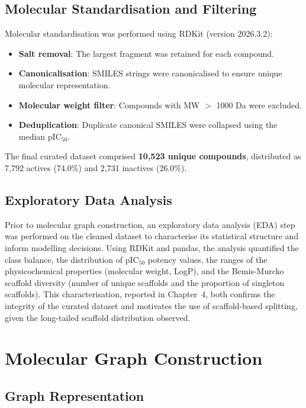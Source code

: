 \subsection{Molecular Standardisation and Filtering}

Molecular standardisation was performed using RDKit (version 2026.3.2):
\begin{itemize}
    \item \textbf{Salt removal}: The largest fragment was retained for each compound.
    \item \textbf{Canonicalisation}: SMILES strings were canonicalised to ensure
          unique molecular representation.
    \item \textbf{Molecular weight filter}: Compounds with MW $>$ 1000 Da
          were excluded.
    \item \textbf{Deduplication}: Duplicate canonical SMILES were collapsed using
          the median pIC$_{50}$.
\end{itemize}

The final curated dataset comprised \textbf{10,523 unique compounds}, distributed
as 7,792 actives (74.0\%) and 2,731 inactives (26.0\%).

\subsection{Exploratory Data Analysis}

Prior to molecular graph construction, an exploratory data analysis (EDA) step was
performed on the cleaned dataset to characterise its statistical structure and inform
modelling decisions. Using RDKit and pandas, the analysis quantified the class
balance, the distribution of pIC$_{50}$ potency values, the ranges of the
physicochemical properties (molecular weight, LogP), and the Bemis-Murcko scaffold
diversity (number of unique scaffolds and the proportion of singleton scaffolds).
This characterisation, reported in Chapter~4, both confirms the integrity of the
curated dataset and motivates the use of scaffold-based splitting, given the
long-tailed scaffold distribution observed.

\section{Molecular Graph Construction}

\subsection{Graph Representation}

